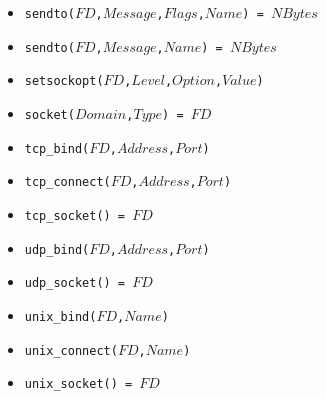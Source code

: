 \documentclass[10pt]{article}
\begin{document}
\begin{multicols}{2}
{\begin{scriptsize}
\begin{itemize}
    \item \texttt{sendto($FD$,$Message$,$Flags$,$Name$) = $NBytes$}
    \item \texttt{sendto($FD$,$Message$,$Name$) = $NBytes$}
    \item \texttt{setsockopt($FD$,$Level$,$Option$,$Value$)}
    \item \texttt{socket($Domain$,$Type$) = $FD$}
    \item \texttt{tcp\_bind($FD$,$Address$,$Port$)}
    \item \texttt{tcp\_connect($FD$,$Address$,$Port$)}
    \item \texttt{tcp\_socket() = $FD$}
    \item \texttt{udp\_bind($FD$,$Address$,$Port$)}
    \item \texttt{udp\_socket() = $FD$}
    \item \texttt{unix\_bind($FD$,$Name$)}
    \item \texttt{unix\_connect($FD$,$Name$)}
    \item \texttt{unix\_socket() = $FD$}
\end{itemize}
\end{scriptsize}
}

\end{multicols}
\end{document}
